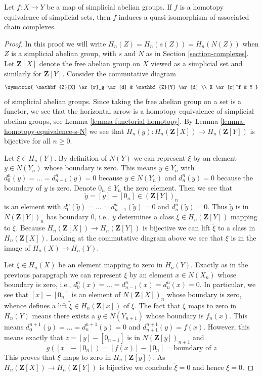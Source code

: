 \begin{lemma}
\label{lemma-homotopy-equivalence}
Let $f : X \to Y$ be a map of simplicial abelian groups. If $f$ is a
homotopy equivalence of simplicial sets, then $f$ induces a
quasi-isomorphism of associated chain complexes.
\end{lemma}

\begin{proof}
In this proof we will write $H_n(Z) = H_n(s(Z)) = H_n(N(Z))$
when $Z$ is a simplicial abelian group, with $s$ and $N$ as in
Section \ref{section-complexes}.
Let $\mathbf{Z}[X]$ denote the free abelian group on $X$ viewed as
a simplicial set and similarly for $\mathbf{Z}[Y]$. Consider the
commutative diagram
$$
\xymatrix{
\mathbf{Z}[X] \ar[r]_g \ar[d] &
\mathbf{Z}[Y] \ar[d] \\
X \ar[r]^f & Y
}
$$
of simplicial abelian groups. Since taking the free abelian group on a set
is a functor, we see that the horizontal arrow is a homotopy equivalence of
simplicial abelian groups, see Lemma \ref{lemma-functorial-homotopy}.
By Lemma \ref{lemma-homotopy-equivalence-s-N}
we see that $H_n(g) : H_n(\mathbf{Z}[X]) \to H_n(\mathbf{Z}[Y])$ is bijective
for all $n \geq 0$.

\medskip\noindent
Let $\xi \in H_n(Y)$. By definition of $N(Y)$ we can represent
$\xi$ by an element $y \in N(Y_n)$ whose boundary is zero.
This means $y \in Y_n$ with $d^n_0(y) = \ldots = d^n_{n - 1}(y) = 0$
because $y \in N(Y_n)$ and $d^n_n(y) = 0$ because the boundary
of $y$ is zero. Denote $0_n \in Y_n$ the zero element. Then we see that
$$
\tilde y = [y] - [0_n] \in (\mathbf{Z}[Y])_n
$$
is an element with $d^n_0(\tilde y) = \ldots = d^n_{n - 1}(\tilde y) = 0$
and $d^n_n(\tilde y) = 0$. Thus $\tilde y$ is in $N(\mathbf{Z}[Y])_n$
has boundary $0$, i.e., $\tilde y$ determines a
class $\tilde \xi \in H_n(\mathbf{Z}[Y])$ mapping to $\xi$.
Because $H_n(\mathbf{Z}[X]) \to H_n(\mathbf{Z}[Y])$ is bijective
we can lift $\tilde \xi$ to a class in $H_n(\mathbf{Z}[X])$.
Looking at the commutative diagram above
we see that $\xi$ is in the image of $H_n(X) \to H_n(Y)$.

\medskip\noindent
Let $\xi \in H_n(X)$ be an element mapping to zero in $H_n(Y)$.
Exactly as in the previous parapgraph we can represent
$\xi$ by an element $x \in N(X_n)$ whose boundary is zero, i.e.,
$d^n_0(x) = \ldots = d^n_{n - 1}(x) = d^n_n(x) = 0$.
In particular, we see that $[x] - [0_n]$ is an element of
$N(\mathbf{Z}[X])_n$ whose boundary is zero, whence defines
a lift $\tilde \xi \in H_n(\mathbf{Z}[x])$ of $\xi$.
The fact that $\xi$ maps to zero in $H_n(Y)$
means there exists a $y \in N(Y_{n + 1})$ whose boundary is $f_n(x)$.
This means $d^{n + 1}_0(y) = \ldots = d^{n + 1}_n(y) = 0$ and
$d^{n + 1}_{n + 1}(y) = f(x)$.
However, this means exactly that
$z = [y] - [0_{n + 1}]$ is in $N(\mathbf{Z}[y])_{n + 1}$ and
$$
g([x] - [0_n]) = [f(x)] - [0_n] = \text{boundary of }z
$$
This proves that $\tilde \xi$ maps to zero in $H_n(\mathbf{Z}[y])$.
As $H_n(\mathbf{Z}[X]) \to H_n(\mathbf{Z}[Y])$ is bijective
we conclude $\tilde \xi = 0$ and hence $\xi = 0$.
\end{proof}